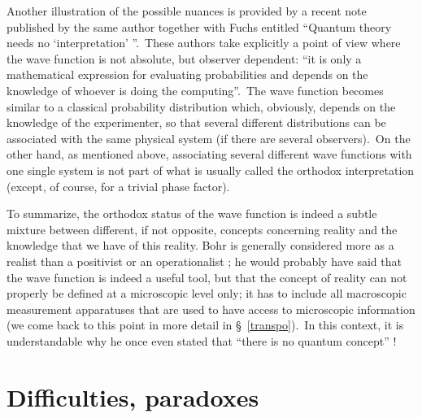\documentclass[12pt,onecolumn]{article}%
\begin{document}
Another illustration of the possible nuances is provided by a recent note
published by the same author together with Fuchs \cite{Fuchs-Peres} entitled
``Quantum theory needs no `interpretation' ''.\ These authors take explicitly
a point of view where the wave function is not absolute, but observer
dependent: ``it is only a mathematical expression for evaluating probabilities
and depends on the knowledge of whoever is doing the computing''.\ The wave
function becomes similar to a classical probability distribution which,
obviously, depends on the knowledge of the experimenter, so that several
different distributions can be associated with the same physical system (if
there are several observers).\ On the other hand, as mentioned above,
associating several different wave functions with one single system is not
part of what is usually called the orthodox interpretation (except, of course,
for a trivial phase factor).

To summarize, the orthodox status of the wave function is indeed a subtle
mixture between different, if not opposite, concepts concerning reality and
the knowledge that we have of this reality. Bohr is generally considered more
as a realist than a positivist or an operationalist \cite{Jammer}; he would
probably have said that the wave function is indeed a useful tool, but that
the concept of reality can not properly be defined at a microscopic level
only; it has to include all macroscopic measurement apparatuses that are used
to have access to microscopic information (we come back to this point in more
detail in \S \ \ref{transpo}).\ In this context, it is understandable why he
once even stated that ``there is no quantum concept'' \cite{Chevalley}!

\section{Difficulties, paradoxes}

\label{diff}
\end{document}
